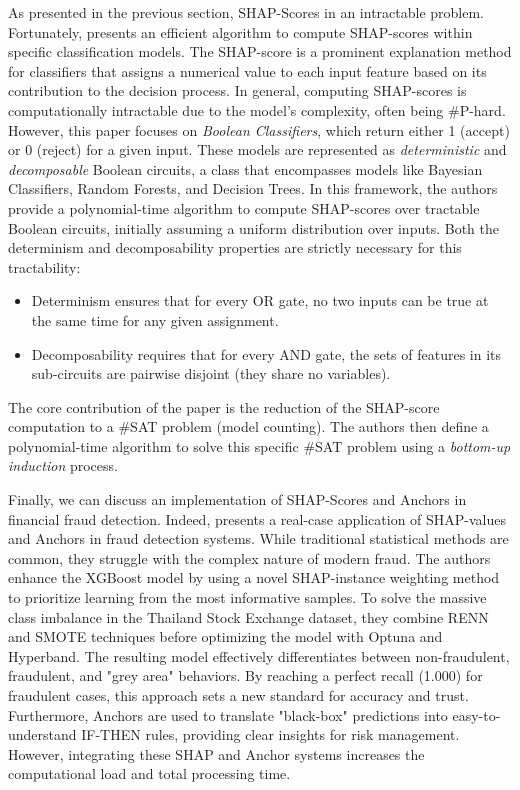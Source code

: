 As presented in the previous section, SHAP-Scores in an intractable problem. 
Fortunately, \textcite{arenas_tractability_2021} presents an efficient algorithm to compute 
SHAP-scores within specific classification models. The SHAP-score is a prominent 
explanation method for classifiers that assigns a numerical value to each input 
feature based on its contribution to the decision process. In general, computing 
SHAP-scores is computationally intractable due to the model's complexity, 
often being \#P-hard.
However, this paper focuses on \emph{Boolean Classifiers}, which return either 1 
(accept) or 0 (reject) for a given input. These models are represented as 
\emph{deterministic} and \emph{decomposable} Boolean circuits, a class that 
encompasses models like Bayesian Classifiers, Random Forests, and Decision Trees.
In this framework, the authors provide a polynomial-time algorithm to compute 
SHAP-scores over tractable Boolean circuits, initially assuming a uniform 
distribution over inputs. Both the determinism and decomposability properties 
are strictly necessary for this tractability:
\begin{itemize}
    \item Determinism ensures that for every OR gate, no two inputs can be true at the same time for any given assignment.
    \item Decomposability requires that for every AND gate, the sets of features in its sub-circuits are pairwise disjoint (they share no variables).
\end{itemize}
The core contribution of the paper is the reduction of the SHAP-score computation 
to a \#SAT problem (model counting). The authors then define a polynomial-time 
algorithm to solve this specific \#SAT problem using a \emph{bottom-up induction} 
process.

Finally, we can discuss an implementation of SHAP-Scores and Anchors in financial 
fraud detection. 
Indeed, \textcite{thanathamathee_shap-instance_2024} presents a real-case application 
of SHAP-values and Anchors in fraud detection systems. While traditional 
statistical methods are common, they struggle with the complex nature of modern 
fraud. The authors enhance the XGBoost model by using a novel SHAP-instance 
weighting method to prioritize learning from the most informative samples. 
To solve the massive class imbalance in the Thailand Stock Exchange dataset, 
they combine RENN and SMOTE techniques before optimizing the model with Optuna 
and Hyperband.
The resulting model effectively differentiates between non-fraudulent, fraudulent, 
and "grey area" behaviors. By reaching a perfect recall (1.000) for fraudulent 
cases, this approach sets a new standard for accuracy and trust. Furthermore, 
Anchors are used to translate "black-box" predictions into easy-to-understand 
IF-THEN rules, providing clear insights for risk management. 
However, integrating these SHAP and Anchor systems increases the computational 
load and total processing time.

